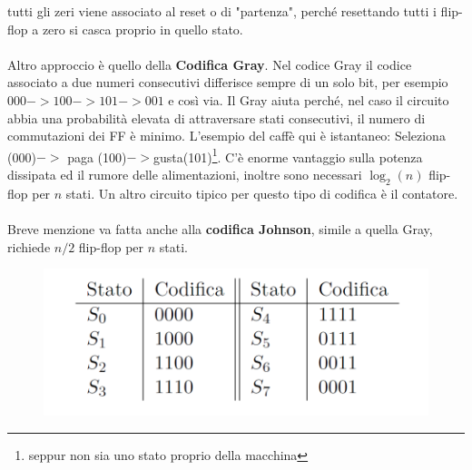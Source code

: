 \documentclass{book}
\begin{document}
        tutti gli zeri viene associato al reset o di "partenza", perché resettando tutti i flip-flop a zero si casca proprio in quello stato.
        \\ \\
        Altro approccio è quello della \textbf{Codifica Gray}. Nel codice Gray il codice associato a due numeri 
        consecutivi differisce sempre di un solo bit, per esempio $000->100->101->001$ e così via. Il Gray aiuta perché,
        nel caso il circuito abbia una probabilità elevata di attraversare stati consecutivi, il numero di commutazioni dei FF
        è minimo. L'esempio del caffè qui è istantaneo: Seleziona (000)$->$ paga (100)$->$gusta(101)\footnote{seppur non sia uno stato proprio della macchina}.
        C'è enorme vantaggio sulla potenza dissipata ed il rumore delle alimentazioni, inoltre sono necessari $\log_{2}(n)$ flip-flop per $n$ stati.
        Un altro circuito tipico per questo tipo di codifica è il contatore. \\ \\
        Breve menzione va fatta anche alla \textbf{codifica Johnson}, simile a quella Gray, richiede $n/2$ flip-flop
        per $n$ stati. 
        \begin{figure}[h!]
            \center  
            \includegraphics[width=0.6\linewidth]{img/chapt14img2.png}
        \end{figure}
\end{document}
